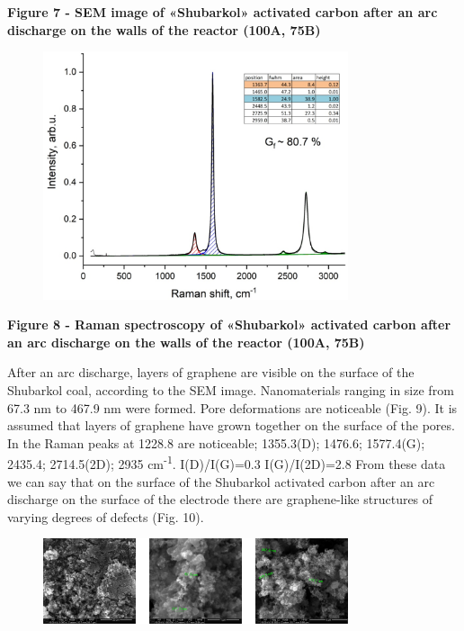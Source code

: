 {\bfseries Figure 7 - SEM image of «Shubarkol» activated carbon after an
arc discharge on the walls of the reactor (100A, 75B)}

\begin{figure}[H]
	\centering
	\includegraphics[width=0.8\textwidth]{assets/60}
	\caption*{}
\end{figure}

{\bfseries Figure 8 - Raman spectroscopy of «Shubarkol» activated carbon
after an arc discharge on the walls of the reactor (100A, 75B)}

After an arc discharge, layers of graphene are visible on the surface of
the Shubarkol coal, according to the SEM image. Nanomaterials ranging in
size from 67.3 nm to 467.9 nm were formed. Pore
\hspace{0pt}\hspace{0pt}deformations are noticeable (Fig. 9). It is
assumed that layers of graphene have grown together on the surface of
the pores. In the Raman peaks at 1228.8 are noticeable; 1355.3(D);
1476.6; 1577.4(G); 2435.4; 2714.5(2D); 2935 cm\textsuperscript{-1}.
I(D)/I(G)=0.3 I(G)/I(2D)=2.8 From these data we can say that on the
surface of the Shubarkol activated carbon after an arc discharge on the
surface of the electrode there are graphene-like structures of varying
degrees of defects (Fig. 10).

\begin{figure}[H]
	\centering
	\includegraphics[width=0.8\textwidth]{assets/61}
	\caption*{}
\end{figure}


